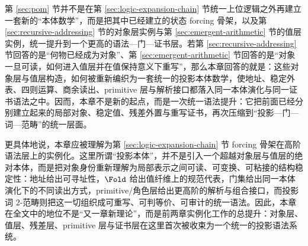 第 \ref{sec:pom} 节并不是在第 \ref{sec:logic-expansion-chain} 节统一上位逻辑之外再建立一套新的“本体数学”，而是把其中已经建立的状态 forcing 骨架，以及第 \ref{sec:recursive-addressing} 节的对象层实例与第 \ref{sec:emergent-arithmetic} 节的值层实例，统一提升到一个更高的语法—门—证书层。若第 \ref{sec:recursive-addressing} 节回答的是“何物已经成为对象”、第 \ref{sec:emergent-arithmetic} 节回答的是“对象一旦可读，如何进入值层并在值保持意义下重写”，那么本章回答的就是：这些对象层与值层构造，如何被重新编织为一套统一的投影本体数学，使地址、稳定外表、四则运算、商余读出、primitive 层与解析接口都落入同一本体演化与同一证书语法之中。因而，本章不是新的起点，而是一次统一语法提升：它把前面已经分别建立起来的局部对象、稳定值、残差外置与重写证书，再次压缩到“投影—门—词—范畴”的统一层面。

更具体地说，本章应被理解为第 \ref{sec:logic-expansion-chain} 节 forcing 骨架在高阶语法层上的实例化。这里所谓“投影本体”，并不是引入一个超越对象层与值层的绝对本体，而是把对象身份重新理解为局部表示之间可读、可变换、可粘接的结构稳定性：地址给出可寻址性，\(\Fold\) 给出值纤维上的规范代表，门集给出同一本体演化下的不同读出方式，primitive/角色层给出更高阶的解析与组合接口，而投影词 \(2\)-范畴则把这一切组织成可重写、可判等价、可审计的统一语法。因此，本章在全文中的地位不是“又一章新理论”，而是前两章实例化工作的总提升：对象层、值层、残差层、primitive 层与证书层在这里首次被收束为一个统一的投影语法系统。
